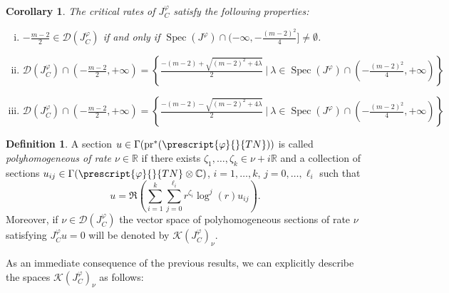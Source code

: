 \documentclass{article}
\numberwithin{equation}{section}        %
\theoremstyle{bfnote}
\newtheorem{cor}[thm]{Corollary}            %
\theoremstyle{definition}
\newtheorem{Def}[thm]{Definition}           %
\theoremstyle{bfremark}
\newcommand{\R}{\mathbb{R}}                 %
\newcommand{\C}{\mathbb{C}}                 %
\newcommand{\pr}{\mathrm{pr}}               %
\DeclareMathOperator{\Spec}{Spec}               %
\begin{document}
\begin{cor}
    The critical rates of $J^\varphi_C$ satisfy the following properties:
    \begin{enumerate}[(i)]
        \item $-\tfrac{m-2}{2} \in \mathcal{D}(J^\varphi_C)$ if and only if $\Spec(J^\varphi) \cap (-\infty, -\tfrac{(m-2)^2}{4}] \neq \emptyset$.
        \item $\mathcal{D}(J^\varphi_C) \cap (-\tfrac{m-2}{2},+\infty) = \left\{ \tfrac{- (m-2) + \sqrt{(m-2)^2 + 4 \lambda}}{2} ~ \big| ~ \lambda \in \Spec(J^\varphi) \cap (-\tfrac{(m-2)^2}{4},+\infty) \right\}$
        \item $\mathcal{D}(J^\varphi_C) \cap (-\tfrac{m-2}{2},+\infty) = \left\{ \tfrac{- (m-2) - \sqrt{(m-2)^2 + 4 \lambda}}{2} ~ \big| ~ \lambda \in \Spec(J^\varphi) \cap (-\tfrac{(m-2)^2}{4},+\infty) \right\}$
    \end{enumerate}
\end{cor}

\begin{Def}
    A section $u \in \Gamma(\pr^*(\prescript{\varphi}{}{TN}))$ is called \emph{polyhomogeneous of rate $\nu \in \R$} if there exists $\zeta_1,\ldots,\zeta_k \in \nu + i \R$ and a collection of sections $u_{ij} \in \Gamma(\prescript{\varphi}{}{TN} \otimes \C)$, $i = 1, \ldots, k$, $j = 0,\ldots,\ell_i$ such that
    \begin{equation*}
        u = \Re \left( \sum_{i=1}^k \sum_{j=0}^{\ell_i} r^{\zeta_i} \log^j(r) u_{ij} \right) .
    \end{equation*}
    Moreover, if $\nu \in \mathcal{D}(J^\varphi_C)$ the vector space of polyhomogeneous sections of rate $\nu$ satisfying $J^\varphi_C u = 0$ will be denoted by $\mathcal{K}(J^\varphi_C)_\nu$.
\end{Def}

As an immediate consequence of the previous results, we can explicitly describe the spaces $\mathcal{K}(J^\varphi_C)_\nu$ as follows:
\end{document}
